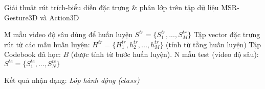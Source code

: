 	\begin{algorithm}
	\caption{Giải thuật rút trích-biểu diễn đặc trưng \& phân lớp trên tập dữ liệu MSR-Gesture3D và Action3D}
	\label{alg_gesture_action3d}
	\begin{algorithmic}
	\renewcommand{\algorithmicrequire}{\textbf{Đầu vào:}}
	\renewcommand{\algorithmicensure}{\textbf{Đầu ra:}}
	\algnewcommand{}
	\algnewcommand\Operation{\item[\algorithmicoperation]}
	
	\Require 
	\State M mẫu video độ sâu dùng để huấn luyện \(S^{tr} = \{S^{tr}_1,...,S^{tr}_M\}\)	
	\State Tập vector đặc trưng rút từ các mẫu huấn luyện: \(H^{tr} = \{H^{tr}_1,h^{tr}_2,...,h^{tr}_M\}\) (tính từ tầng huấn luyện)
	\State Tập Codebook đã học: \(B\) (được tính từ bước huấn luyện).
	\State N mẫu test (video độ sâu): $S^{te} = \{S^{te}_1,...,S^{te}_N\}$
	
	\Ensure 
	\State Kết quả nhận dạng: \textit{Lóp hành động ($class$)}
	

\end{algorithmic}
\end{algorithm}
